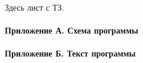 Здесь лист с ТЗ.
\newpage
{}

\tableofcontents                                
\paragraph{Приложение А. Схема программы}
\paragraph{Приложение Б. Текст программы}
\newpage
